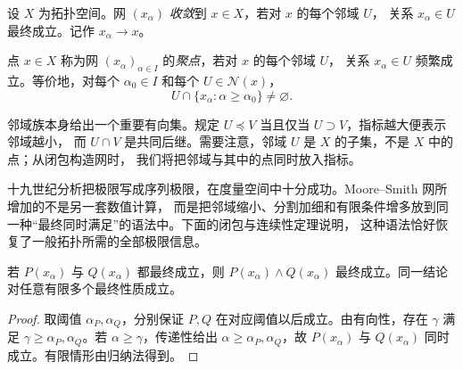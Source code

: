 \begin{definition}[网收敛]\label{def:1-1-1-3}
设 \(X\) 为拓扑空间。网 \((x_\alpha)\) \emph{收敛}到 \(x\in X\)，若对 \(x\) 的每个邻域 \(U\)，
关系 \(x_\alpha\in U\) 最终成立。记作 \(x_\alpha\to x\)。
\end{definition}

\begin{definition}[网的聚点]\label{def:1-1-1-cluster}
点 \(x\in X\) 称为网 \((x_\alpha)_{\alpha\in I}\) 的\emph{聚点}，若对 \(x\) 的每个邻域 \(U\)，
关系 \(x_\alpha\in U\) 频繁成立。等价地，对每个 \(\alpha_0\in I\) 和每个
\(U\in\mathcal N(x)\)，
\[
  U\cap\{x_\alpha:\alpha\geq\alpha_0\}\ne\varnothing.
\]
\end{definition}

邻域族本身给出一个重要有向集。规定 \(U\preceq V\) 当且仅当 \(U\supset V\)，指标越大便表示邻域越小，
而 \(U\cap V\) 是共同后继。需要注意，邻域 \(U\) 是 \(X\) 的子集，不是 \(X\) 中的点；从闭包构造网时，
我们将把邻域与其中的点同时放入指标。

\begin{remark}
十九世纪分析把极限写成序列极限，在度量空间中十分成功。Moore--Smith 网所增加的不是另一套数值计算，
而是把邻域缩小、分割加细和有限条件增多放到同一种“最终同时满足”的语法中。下面的闭包与连续性定理说明，
这种语法恰好恢复了一般拓扑所需的全部极限信息。
\end{remark}

\begin{proposition}[最终性质的有限交法则]\label{proposition:1-1-1-1}
若 \(P(x_\alpha)\) 与 \(Q(x_\alpha)\) 都最终成立，则
\(P(x_\alpha)\wedge Q(x_\alpha)\) 最终成立。同一结论对任意有限多个最终性质成立。
\end{proposition}
\begin{proof}
取阈值 \(\alpha_P,\alpha_Q\)，分别保证 \(P,Q\) 在对应阈值以后成立。由有向性，存在 \(\gamma\) 满足
\(\gamma\geq\alpha_P,\alpha_Q\)。若 \(\alpha\geq\gamma\)，传递性给出
\(\alpha\geq\alpha_P,\alpha_Q\)，故 \(P(x_\alpha)\) 与 \(Q(x_\alpha)\) 同时成立。有限情形由归纳法得到。
\end{proof}

